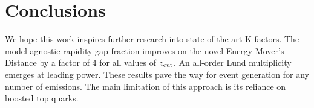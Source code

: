 \section{Conclusions}\label{sec:conclusions}

We hope this work inspires further research into state-of-the-art
K-factors. The model-agnostic rapidity gap fraction improves on the
novel Energy Mover's Distance by a factor of 4 for all values of $z_{\rm
cut}$. An all-order Lund multiplicity emerges at leading power. These
results pave the way for event generation for any number of emissions.
The main limitation of this approach is its reliance on boosted top
quarks.

